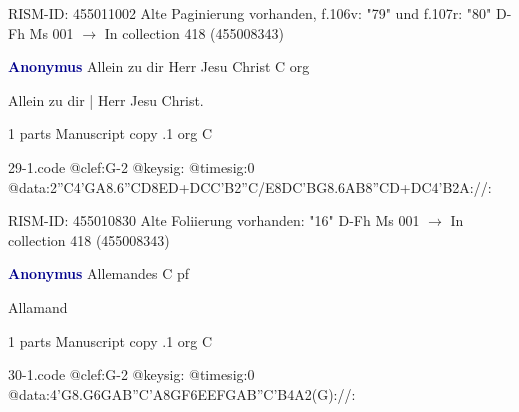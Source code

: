 \documentclass[twocolumn]{book}
\begin{document}
\newline RISM-ID: 455011002
\newline Alte Paginierung vorhanden, f.106v: "79" und f.107r: "80"
\newline D-Fh  Ms 001
\newline $\rightarrow$ In collection 418 (455008343)

\newline \par \vspace{7pt} \textcolor{darkblue}{\textbf{Anonymus  }}
\newline Allein zu dir Herr Jesu Christ  C  
\newline org
\newline \begin{itshape}[f.16r, at left:] Allein zu dir | Herr Jesu Christ.\end{itshape} 
\newline \textcolor{darkblue}{}  1 parts  
\newline Manuscript copy
.1  org  C  
\begin{filecontents*}{29-1.code}
@clef:G-2
@keysig:
@timesig:0
@data:2''C4'GA{8.6''CD8ED+}{DCC'B}2''C/E{8DC'BG}{8.6AB8''CD+}{DC}4'B2A://:
\end{filecontents*}
\newline
%

\newline RISM-ID: 455010830
\newline Alte Foliierung vorhanden: "16"
\newline D-Fh  Ms 001
\newline $\rightarrow$ In collection 418 (455008343)

\newline \par \vspace{7pt} \textcolor{darkblue}{\textbf{Anonymus  }}
\newline Allemandes  C  
\newline pf
\newline \begin{itshape}[f.57v, at left:] Allamand\end{itshape} 
\newline \textcolor{darkblue}{}  1 parts  
\newline Manuscript copy
.1  org  C  
\begin{filecontents*}{30-1.code}
@clef:G-2
@keysig:
@timesig:0
@data:4'G{8.G6G}{AB''C'A}{8GF}{6EEFG}{AB''C'B}4A2(G)://:
\end{filecontents*}
\newline
%
\end{document}
